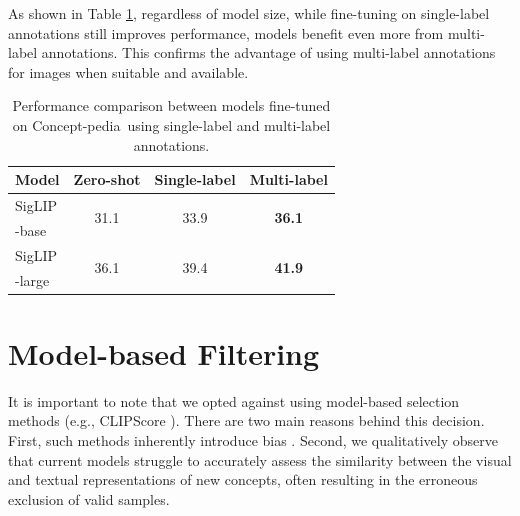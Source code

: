 \documentclass[11pt]{article}
\newcommand{\resource}{Concept-pedia}
\begin{document}
As shown in Table \ref{tab:single-label}, regardless of model size, while fine-tuning on single-label annotations still improves performance, models benefit even more from multi-label annotations. This confirms the advantage of using multi-label annotations for images when suitable and available.




\begin{table}[t]
    \centering
    \setlength{\tabcolsep}{4pt}

    \label{tab:model_comparison}
    \begin{tabular}{lccc}
        \toprule
        \textbf{Model}  & \textbf{Zero-shot} & \textbf{Single-label} & \textbf{Multi-label} \\ 
        \midrule
         SigLIP &  \multirow{2}{*}{31.1} & \multirow{2}{*}{33.9}   & \multirow{2}{*}{\textbf{36.1}} \\ 
        -base  &     &     & \\ 
          \midrule
        SigLIP & \multirow{2}{*}{36.1} & \multirow{2}{*}{39.4} & \multirow{2}{*}{\textbf{41.9}} \\ 
              -large &   &   &  \\ 
              \bottomrule
    \end{tabular}
    \caption{Performance comparison between models fine-tuned on \resource~using single-label and multi-label annotations.}
    \label{tab:single-label}
\end{table}



\section{Model-based Filtering}
    It is important to note that we opted against using model-based selection methods (e.g., CLIPScore \citep{hessel2021clipscore}).
There are two main reasons behind this decision. 
First, such methods inherently introduce bias \cite{gadre2024datacomp}. 
Second, we qualitatively observe that current models struggle to accurately assess the similarity between the visual and textual representations of new concepts, often resulting in the erroneous exclusion of valid samples.
\end{document}
